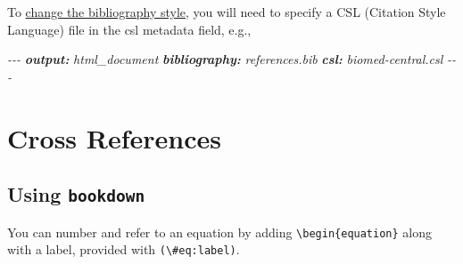 \documentclass[
]{book}
\newenvironment{Shaded}{\begin{snugshade}}{\end{snugshade}}
\newcommand{\AnnotationTok}[1]{\textcolor[rgb]{0.56,0.35,0.01}{\textbf{\textit{#1}}}}
\newcommand{\CommentTok}[1]{\textcolor[rgb]{0.56,0.35,0.01}{\textit{#1}}}
\theoremstyle{definition}
\theoremstyle{definition}
\theoremstyle{definition}
\theoremstyle{definition}
\theoremstyle{remark}
\begin{document}
To \href{https://bookdown.org/yihui/rmarkdown-cookbook/bibliography.html\#changing-citation-style}{change the bibliography style}, you will need to specify a CSL (Citation Style Language) file in the csl metadata field, e.g.,

\begin{Shaded}
\begin{Highlighting}[]
\CommentTok{{-}{-}{-}}
\AnnotationTok{output:}\CommentTok{ html\_document}
\AnnotationTok{bibliography:}\CommentTok{ references.bib  }
\AnnotationTok{csl:}\CommentTok{ biomed{-}central.csl}
\CommentTok{{-}{-}{-}}
\end{Highlighting}
\end{Shaded}

\section{Cross References}\label{cross-references}

\subsection{\texorpdfstring{Using \texttt{bookdown}}{Using bookdown}}\label{using-bookdown}

You can number and refer to an equation by adding \texttt{\textbackslash{}begin\{equation\}} along with a label, provided with \texttt{(\textbackslash{}\#eq:label)}.
\end{document}
